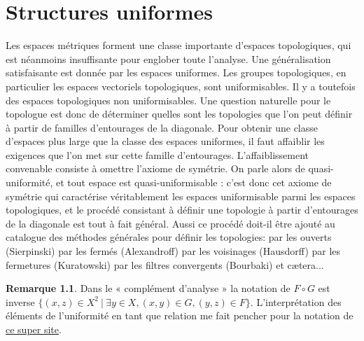 \documentclass[a4paper, 11pt, french]{book}
\theoremstyle{plain} %
\theoremstyle{definition} %
\newtheorem{remarque}{Remarque}
\theoremstyle{remark} %
\newcommand{\1}{\mathds{1}}
\newcommand\ens[2]{\{#1 \ |\ #2\}}
\begin{document}
\chapter{Structures uniformes}

Les espaces métriques forment une classe importante d'espaces topologiques, qui est néanmoins insuffisante pour englober toute l’analyse.
Une généralisation satisfaisante est donnée par les espaces uniformes.
Les groupes topologiques, en particulier les espaces vectoriels topologiques, sont uniformisables.
Il y a toutefois des espaces topologiques non uniformisables.
Une question naturelle pour le topologue est donc de déterminer quelles sont les topologies que l'on peut définir à partir de familles d'entourages de la diagonale.
Pour obtenir une classe d'espaces plus large que la classe des espaces uniformes, il faut affaiblir les exigences que l'on met sur cette famille d'entourages.
L'affaiblissement convenable consiste à omettre l'axiome de symétrie.
On parle alors de quasi-uniformité, et tout espace est quasi-uniformisable : c'est donc cet axiome de symétrie qui caractérise véritablement les espaces uniformisable parmi les espaces topologiques, et le procédé consistant à définir une topologie à partir d'entourages de la diagonale est tout à fait général.
Aussi ce procédé doit-il être ajouté au catalogue des méthodes générales pour définir les topologies: par les ouverts (Sierpinski) par les fermés (Alexandroff) par les voisinages (Hausdorff) par les fermetures (Kuratowski) par les filtres convergents (Bourbaki) et cætera...

\begin{remarque}
	Dans le « complément d'analyse » la notation de $F\circ G$ est inverse $\ens{(x, z)\in X^2}{\exists y\in X, (x, y)\in G, (y, z)\in F}$.
	L'interprétation des éléments de l'uniformité en tant que relation me fait pencher pour la notation de \href{https://projects.lsv.ens-paris-saclay.fr/topology/?page_id=2869}{ce super site}.
\end{remarque}
\end{document}
